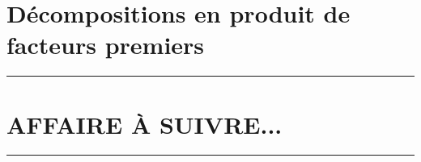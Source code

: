 \documentclass[12pt]{amsart}
\begin{document}
\section{Décompositions en produit de facteurs premiers}










\bigskip

\hrule

\section{AFFAIRE À SUIVRE...}

\bigskip

\hrule

%
%
%
%
%
%
%
%
%
%
%
%
\end{document}

